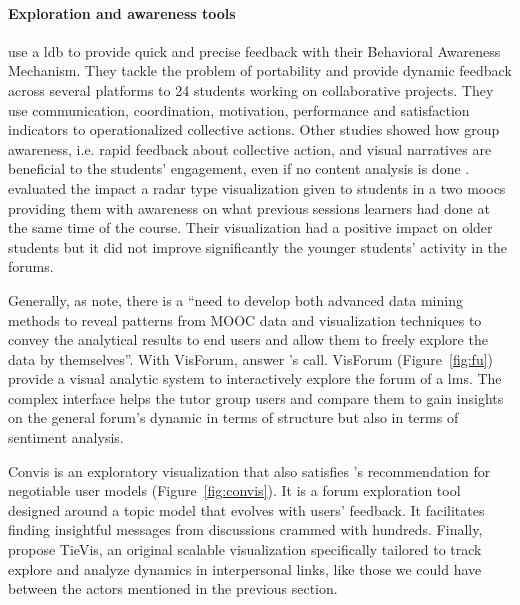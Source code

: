 \documentclass[a4paper,twoside]{article}
\begin{document}
\paragraph{Exploration and awareness tools}
\cite{Medina2016} use a \gls{ldb} to provide quick and precise feedback with their Behavioral Awareness Mechanism.  They tackle the problem of portability and provide dynamic feedback across several platforms to 24 students working on collaborative projects.  They use communication, coordination, motivation, performance and satisfaction indicators to operationalized collective actions.  Other studies showed how group awareness, i.e.  rapid feedback about collective action, and visual narratives \citep{Yousuf2015} are beneficial to the students' engagement, even if no content analysis is done \citep{Davis2017,May2011,Medina2016}.
\cite{Davis2017} evaluated the impact a radar type visualization given to students in a two \glspl{mooc} providing them with awareness on what previous sessions learners had done at the same time of the course.  Their visualization had a positive impact on older students but it did not improve significantly the younger students' activity in the forums.

Generally, as \cite{Qu2015} note, there is a ``need to develop both advanced data mining methods to reveal patterns from MOOC data and visualization techniques to convey the analytical results to end users and allow them to freely explore the data by themselves''.
With VisForum, \cite{Fu2017} answer \cite{Qu2015}'s call.  VisForum (Figure~\ref{fig:fu}) provide a visual analytic system to interactively explore the forum of a \gls{lms}.  The complex interface helps the tutor group users and compare them to gain insights on the general forum's dynamic in terms of structure but also in terms of sentiment analysis.

Convis is an exploratory visualization that also satisfies \cite{Bull2016}'s recommendation for negotiable user models (Figure~\ref{fig:convis}).  It is a forum exploration tool designed around a topic model that evolves with users' feedback.   It facilitates finding insightful messages from discussions
crammed with hundreds.
Finally, \cite{Guo2017} propose TieVis, an original scalable visualization specifically tailored to track explore and analyze dynamics in interpersonal links, like those we could have between the actors mentioned in the previous section.
\end{document}
